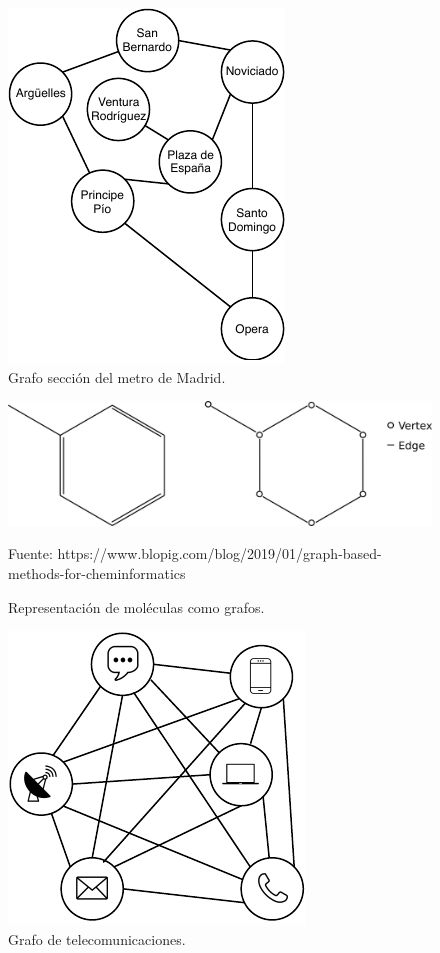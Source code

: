  \begin{figure}[H]
	\centering
	\includegraphics{Figures/metro-graph.pdf}
	\caption{Grafo sección del metro de Madrid.}
	\label{fig:metro-graph}
\end{figure}

 \begin{figure}[H]
	\centering
	\includegraphics[scale=0.3]{Figures/molecula-graph.pdf}
	\caption{Representación de moléculas como grafos.}
	\scriptsize Fuente: https://www.blopig.com/blog/2019/01/graph-based-methods-for-cheminformatics
	\label{fig:molecula-graph}
\end{figure}


 \begin{figure}[H]
	\centering
	\includegraphics{Figures/teleco-graph.pdf}
	\caption{Grafo de telecomunicaciones.}
	\label{fig:teleco-graph}
\end{figure}

